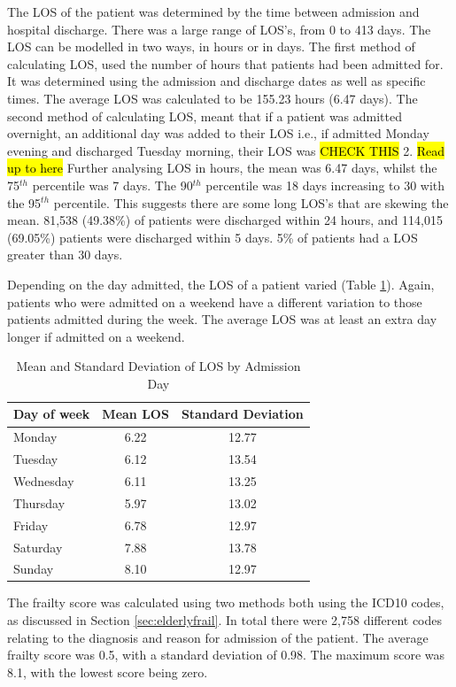 \documentclass[../thesis.tex]{subfiles}
\begin{document}
The LOS of the patient was determined by the time between admission and hospital discharge. There was a large range of LOS's, from 0 to 413 days. The LOS can be modelled in two ways, in hours or in days. The first method of calculating LOS, used the number of hours that patients had been admitted for. It was determined using the admission and discharge dates as well as specific times. The average LOS was calculated to be 155.23 hours (6.47 days). The second method of calculating LOS, meant that if a patient was admitted overnight, an additional day was added to their LOS i.e., if admitted Monday evening and discharged Tuesday morning, their LOS was \hl{CHECK THIS} 2.
\hl{Read up to here}
Further analysing LOS in hours, the mean was 6.47 days, whilst the 75$^{th}$ percentile was 7 days. The 90$^{th}$ percentile was 18 days increasing to 30 with the 95$^{th}$ percentile. This suggests there are some long LOS's that are skewing the mean. 81,538 (49.38\%) of patients were discharged within 24 hours, and 114,015 (69.05\%) patients were discharged within 5 days. 5\% of patients had a LOS greater than 30 days.

Depending on the day admitted, the LOS of a patient varied (Table \ref{tab:DayLOS}). Again, patients who were admitted on a weekend have a different variation to those patients admitted during the week. The average LOS was at least an extra day longer if admitted on a weekend.

\begin{table}[h!]
    \centering
    \begin{tabular}{lcc}\toprule
    \textbf{Day of week} & \textbf{Mean LOS} & \textbf{Standard Deviation}\\    \midrule
    Monday & 6.22 & 12.77\\
    Tuesday & 6.12 & 13.54\\
    Wednesday &6.11 &13.25\\
    Thursday &5.97 & 13.02\\
    Friday &6.78  &12.97\\
    Saturday & 7.88 & 13.78\\
    Sunday & 8.10  &12.97\\ \bottomrule
    \end{tabular}
    \caption{Mean and Standard Deviation of LOS by Admission Day}
    \label{tab:DayLOS}
\end{table}

The frailty score was calculated using two methods both using the ICD10 codes, as discussed in Section \ref{sec:elderlyfrail}. In total there were 2,758 different codes relating to the diagnosis and reason for admission of the patient. The average frailty score was 0.5, with a standard deviation of 0.98. The maximum score was 8.1, with the lowest score being zero.
\end{document}
